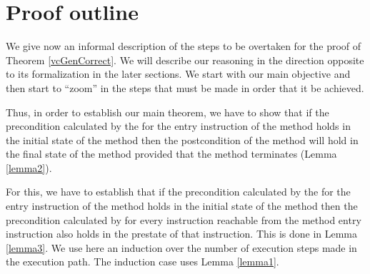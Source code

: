 \section{Proof outline} \label{proof:outline}


We  give now  an informal description of the steps to be overtaken for the proof of Theorem \ref{vcGenCorrect}.
We will describe our reasoning in the direction opposite to its formalization in the later sections.
 We start with our main objective and then start to ``zoom'' in the steps that must be made in order that it be achieved. 


Thus, in order to establish our main theorem, we have to show that if the precondition calculated by 
the \fwpi{} for the entry instruction of the method
holds in the initial state of the method
then the postcondition of the method will hold in the final state of the method provided that the method terminates
(Lemma \ref{lemma2}). 

 For this, we have to establish that if the precondition calculated by
the \fwpi{} for the entry instruction of the method holds in the initial state of the method then the precondition calculated by \fwpi{}
for every instruction reachable from the method entry instruction also holds in the prestate of that instruction. This is done in Lemma \ref{lemma3}. 
We use here an induction over the number of execution steps made in the execution path.
The induction case uses Lemma \ref{lemma1}.

